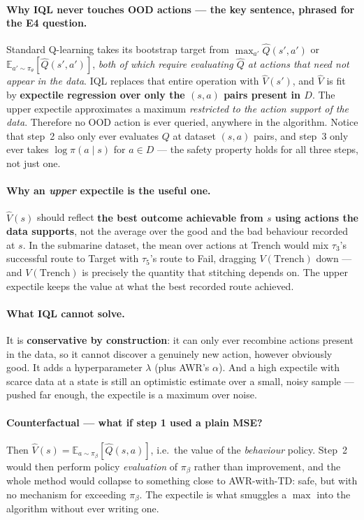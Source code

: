 \documentclass[11pt,a4paper]{article}
\begin{document}
\paragraph{Why IQL never touches OOD actions --- the key sentence, phrased for
the E4 question.} Standard Q-learning takes its bootstrap target from
$\max_{a'}\hat Q(s',a')$ or $\mathbb E_{a'\sim\pi_\theta}[\hat Q(s',a')]$,
\emph{both of which require evaluating $\hat Q$ at actions that need not
appear in the data}. IQL replaces that entire operation with $\hat V(s')$,
and $\hat V$ is fit by \textbf{expectile regression over only the $(s,a)$
pairs present in $D$}. The upper expectile approximates a maximum
\emph{restricted to the action support of the data}. Therefore no OOD action
is ever queried, anywhere in the algorithm. Notice that step~2 also only ever
evaluates $Q$ at dataset $(s,a)$ pairs, and step~3 only ever takes
$\log\pi(a\mid s)$ for $a\in D$ --- the safety property holds for all three
steps, not just one.

\paragraph{Why an \emph{upper} expectile is the useful one.} $\hat V(s)$
should reflect \textbf{the best outcome achievable from $s$ using actions the
data supports}, not the average over the good and the bad behaviour recorded
at $s$. In the submarine dataset, the mean over actions at Trench would mix
$\tau_3$'s successful route to Target with $\tau_5$'s route to Fail, dragging
$V(\text{Trench})$ down --- and $V(\text{Trench})$ is precisely the quantity
that stitching depends on. The upper expectile keeps the value at what the
best recorded route achieved.

\paragraph{What IQL cannot solve.} It is \textbf{conservative by
construction}: it can only ever recombine actions present in the data, so it
cannot discover a genuinely new action, however obviously good. It adds a
hyperparameter $\lambda$ (plus AWR's $\alpha$). And a high expectile with
scarce data at a state is still an optimistic estimate over a small,
noisy sample --- pushed far enough, the expectile is a maximum over noise.

\paragraph{Counterfactual --- what if step 1 used a plain MSE?} Then
$\hat V(s)=\mathbb E_{a\sim\pi_\beta}[\hat Q(s,a)]$, i.e.\ the value of the
\emph{behaviour} policy. Step~2 would then perform policy \emph{evaluation}
of $\pi_\beta$ rather than improvement, and the whole method would collapse
to something close to AWR-with-TD: safe, but with no mechanism for exceeding
$\pi_\beta$. The expectile is what smuggles a $\max$ into the algorithm
without ever writing one.
\end{document}
